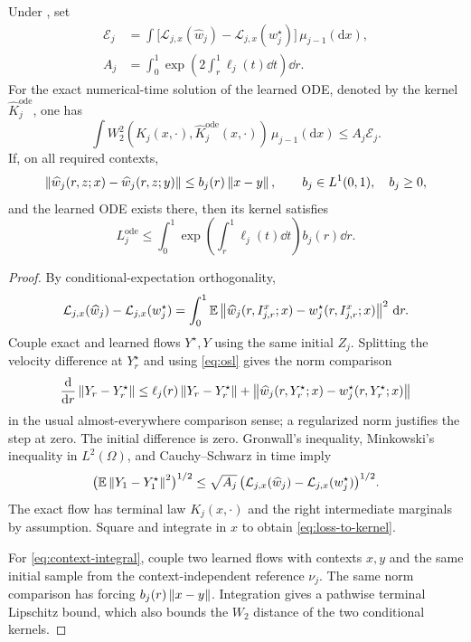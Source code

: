 \begin{theorem}\label{thm:flow-certificate}
Under , set
\begin{align}
 \mathcal E_j&=\int\bigl[\mathcal L_{j,x}(\widehat w_j)-
                         \mathcal L_{j,x}(w_j^\star)\bigr]\,\mu_{j-1}(\mathrm dx),
 \label{eq:excess}\\
 A_j&=\int_0^1\exp\left(2\int_r^1\ell_j(t)\dd t\right)\dd r.
\end{align}
For the exact numerical-time solution of the learned ODE, denoted by the kernel $\widehat K_j^{\mathrm{ode}}$, one has
\begin{equation}\label{eq:loss-to-kernel}
 \int W_2^2(K_j(x,\cdot),\widehat K_j^{\mathrm{ode}}(x,\cdot))\,
           \mu_{j-1}(\mathrm dx)\le A_j\mathcal E_j.
\end{equation}
If, on all required contexts,
\begin{equation}\label{eq:context-field}
 \left\lVert\widehat w_j(r,z;x)-\widehat w_j(r,z;y)\right\rVert
 \le b_j(r)\left\lVert x-y\right\rVert,\qquad b_j\in L^1(0,1),\quad b_j\ge0,
\end{equation}
and the learned ODE exists there, then its kernel satisfies
\begin{equation}\label{eq:context-integral}
 L_j^{\mathrm{ode}}\le\int_0^1
 \exp\left(\int_r^1\ell_j(t)\dd t\right)b_j(r)\dd r.
\end{equation}
\end{theorem}
\begin{proof}
By conditional-expectation orthogonality,
\begin{equation}\label{eq:fm-orthogonality}
 \mathcal L_{j,x}(\widehat w_j)-\mathcal L_{j,x}(w_j^\star)
 =\int_0^1\mathbb E\left\lVert\widehat w_j(r,I^x_{j,r};x)-w_j^\star(r,I^x_{j,r};x)\right\rVert^2\,\mathrm d r.
\end{equation}
Couple exact and learned flows $Y^\star,Y$ using the same initial $Z_j$. Splitting the velocity difference at $Y_r^\star$ and using \eqref{eq:osl} gives the norm comparison
\[
 \frac{\mathrm d}{\mathrm dr}\left\lVert Y_r-Y_r^\star\right\rVert
 \le\ell_j(r)\left\lVert Y_r-Y_r^\star\right\rVert
  +\left\lVert\widehat w_j(r,Y_r^\star;x)-w_j^\star(r,Y_r^\star;x)\right\rVert
\]
in the usual almost-everywhere comparison sense; a regularized norm justifies the step at zero. The initial difference is zero. Gronwall's inequality, Minkowski's inequality in $L^2(\Omega)$, and Cauchy--Schwarz in time imply
\[
 \bigl(\mathbb E\left\lVert Y_1-Y_1^\star\right\rVert^2\bigr)^{1/2}
 \le\sqrt{A_j}\,
 \bigl(\mathcal L_{j,x}(\widehat w_j)-\mathcal L_{j,x}(w_j^\star)\bigr)^{1/2}.
\]
The exact flow has terminal law $K_j(x,\cdot)$ and the right intermediate marginals by assumption. Square and integrate in $x$ to obtain \eqref{eq:loss-to-kernel}.

For \eqref{eq:context-integral}, couple two learned flows with contexts $x,y$ and the same initial sample from the context-independent reference $\nu_j$. The same norm comparison has forcing $b_j(r)\left\lVert x-y\right\rVert$. Integration gives a pathwise terminal Lipschitz bound, which also bounds the $W_2$ distance of the two conditional kernels.
\end{proof}

